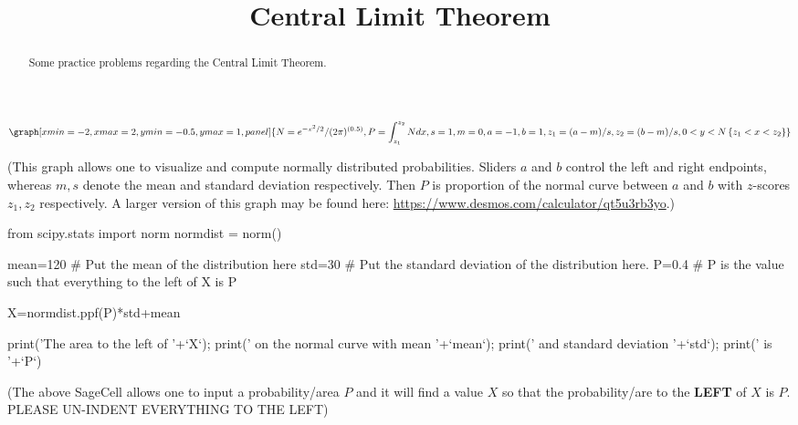 \documentclass{ximera}
\title{Central Limit Theorem}
\begin{document}
    
 \begin{abstract}
 Some practice problems regarding the Central Limit Theorem.
 \end{abstract}   
    
      
      
\maketitle
      
 


\begin{onlineOnly}
$$\graph[xmin=-2,xmax=2,ymin=-0.5,ymax=1, panel]{N=e^{-x^2/2}/(2\pi)^{(0.5)}, P=\int_{z_1}^{z_2} N dx, s=1, m=0, a=-1, b=1, z_1=(a-m)/s, z_2=(b-m)/s, 0<y<N\left\{z_1<x<z_2\right\}}$$
\end{onlineOnly}
(This graph allows one to visualize and compute normally distributed probabilities.  Sliders $a$ and $b$ control the left and right endpoints, whereas $m, s$ denote the mean and standard deviation respectively.  Then $P$ is proportion of the normal curve between $a$ and $b$ with $z$-scores $z_1, z_2$ respectively.  A larger version of this graph may be found here: \url{https://www.desmos.com/calculator/qt5u3rb3yo}.)


\begin{sageCell}
from scipy.stats import norm
normdist = norm()

mean=120 # Put the mean of the distribution here
std=30  # Put the standard deviation of the distribution here.
P=0.4  # P is the value such that everything to the left of X is P



X=normdist.ppf(P)*std+mean

print('The area to the left of '+`X`); print(' on the normal curve with mean '+`mean`); print(' and standard deviation '+`std`); print(' is  '+`P`)
\end{sageCell}
(The above SageCell allows one to input a probability/area $P$ and it will find a value $X$ so that the probability/are to the \textbf{LEFT} of $X$ is $P$.  PLEASE UN-INDENT EVERYTHING TO THE LEFT)
\end{document}
